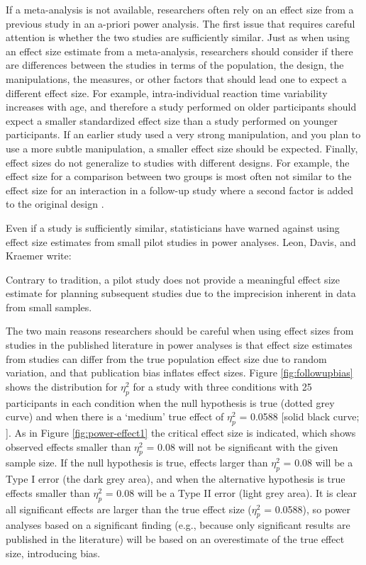 \documentclass[
  oneside]{krantz}
\renewenvironment{quote}{\begin{VF}}{\end{VF}}
\begin{document}
If a meta-analysis is not available, researchers often rely on an effect size from a previous study in an a-priori power analysis. The first issue that requires careful attention is whether the two studies are sufficiently similar. Just as when using an effect size estimate from a meta-analysis, researchers should consider if there are differences between the studies in terms of the population, the design, the manipulations, the measures, or other factors that should lead one to expect a different effect size. For example, intra-individual reaction time variability increases with age, and therefore a study performed on older participants should expect a smaller standardized effect size than a study performed on younger participants. If an earlier study used a very strong manipulation, and you plan to use a more subtle manipulation, a smaller effect size should be expected. Finally, effect sizes do not generalize to studies with different designs. For example, the effect size for a comparison between two groups is most often not similar to the effect size for an interaction in a follow-up study where a second factor is added to the original design \citep{lakens_simulation-based_2021}.

Even if a study is sufficiently similar, statisticians have warned against using effect size estimates from small pilot studies in power analyses. Leon, Davis, and Kraemer \citeyearpar{leon_role_2011} write:

\begin{quote}
Contrary to tradition, a pilot study does not provide a meaningful effect size estimate for planning subsequent studies due to the imprecision inherent in data from small samples.
\end{quote}

The two main reasons researchers should be careful when using effect sizes from studies in the published literature in power analyses is that effect size estimates from studies can differ from the true population effect size due to random variation, and that publication bias inflates effect sizes. Figure \ref{fig:followupbias} shows the distribution for \(\eta_p^2\) for a study with three conditions with 25 participants in each condition when the null hypothesis is true (dotted grey curve) and when there is a `medium' true effect of \(\eta_p^2\) = 0.0588 {[}solid black curve; \citet{richardson_eta_2011}{]}. As in Figure \ref{fig:power-effect1} the critical effect size is indicated, which shows observed effects smaller than \(\eta_p^2\) = 0.08 will not be significant with the given sample size. If the null hypothesis is true, effects larger than \(\eta_p^2\) = 0.08 will be a Type I error (the dark grey area), and when the alternative hypothesis is true effects smaller than \(\eta_p^2\) = 0.08 will be a Type II error (light grey area). It is clear all significant effects are larger than the true effect size (\(\eta_p^2\) = 0.0588), so power analyses based on a significant finding (e.g., because only significant results are published in the literature) will be based on an overestimate of the true effect size, introducing bias.
\end{document}
